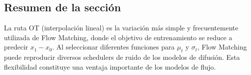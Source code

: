 \subsection{Resumen de la sección}

La ruta OT (interpolación lineal) es la variación más simple y frecuentemente utilizada de Flow Matching, donde el objetivo de entrenamiento se reduce a predecir $x_1 - x_0$. Al seleccionar diferentes funciones para $\mu_t$ y $\sigma_t$, Flow Matching puede reproducir diversos schedulers de ruido de los modelos de difusión. Esta flexibilidad constituye una ventaja importante de los modelos de flujo.
